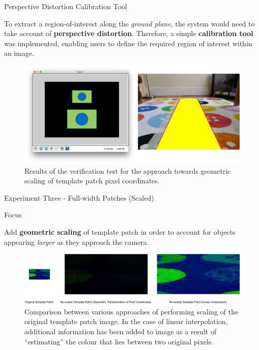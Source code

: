 \documentclass[10pt, compress]{beamer}
\begin{document}
\begin{frame}{Perspective Distortion Calibration Tool}

\vspace{-5pt}

To extract a region-of-interest along the \textit{ground plane}, the system would need to take account of \textbf{perspective distortion}. Therefore, a simple \textbf{calibration tool} was implemented, enabling users to define the required region of interest within an image.

 \begin{figure}[ht!]
\centering
\includegraphics[scale=0.2]{calib_tool}
\vspace{-10pt}
 \caption{Results of the verification test for the approach towards geometric scaling of template patch pixel coordinates.}
\end{figure}

\end{frame}

\begin{frame}{Experiment Three - Full-width Patches (Scaled)}

\begin{block}{Focus}

Add \textbf{geometric scaling} of template patch in order to account for objects appearing \textit{larger} as they approach the camera. 
	
\end{block}
 \vspace{15pt}
  \begin{figure}[ht!]
\centering
\includegraphics[scale=0.28]{scaling_types}
 \caption{Comparison between various approaches of performing scaling of the original template patch image. In the case of linear interpolation, additional information has been added to image as a result of “estimating” the colour that lies between two original pixels.}
\end{figure}

\end{frame}
\end{document}

